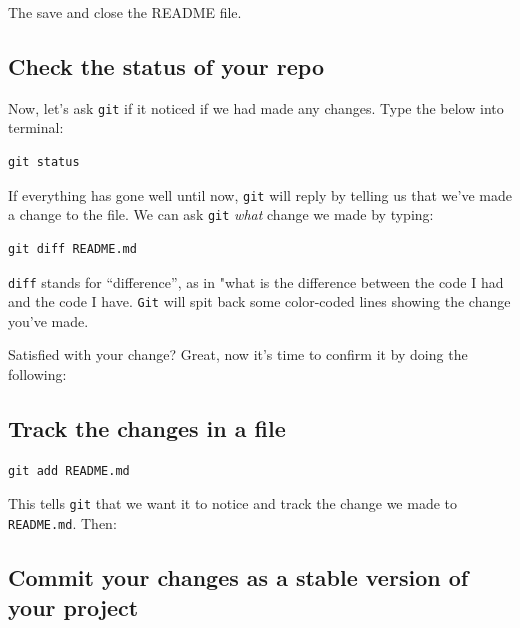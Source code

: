 \documentclass[
]{book}
\begin{document}
The save and close the README file.

\hypertarget{check-the-status-of-your-repo}{%
\subsection*{Check the status of your repo}\label{check-the-status-of-your-repo}}

Now, let's ask \texttt{git} if it noticed if we had made any changes. Type the below into terminal:

\begin{verbatim}
git status
\end{verbatim}

If everything has gone well until now, \texttt{git} will reply by telling us that we've made a change to the file. We can ask \texttt{git} \emph{what} change we made by typing:

\begin{verbatim}
git diff README.md
\end{verbatim}

\texttt{diff} stands for ``difference'', as in "what is the difference between the code I had and the code I have. \texttt{Git} will spit back some color-coded lines showing the change you've made.

Satisfied with your change? Great, now it's time to confirm it by doing the following:

\hypertarget{track-the-changes-in-a-file}{%
\subsection*{Track the changes in a file}\label{track-the-changes-in-a-file}}

\begin{verbatim}
git add README.md
\end{verbatim}

This tells \texttt{git} that we want it to notice and track the change we made to \texttt{README.md}. Then:

\hypertarget{commit-your-changes-as-a-stable-version-of-your-project}{%
\subsection*{Commit your changes as a stable version of your project}\label{commit-your-changes-as-a-stable-version-of-your-project}}
\end{document}
